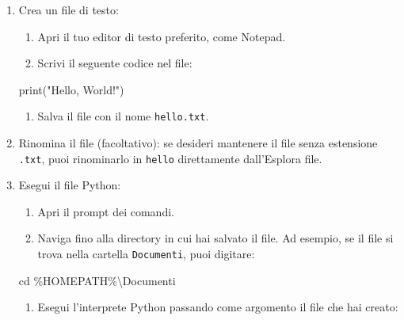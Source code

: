 \documentclass[
  letterpaper,
]{scrbook}
\newenvironment{Shaded}{\begin{snugshade}}{\end{snugshade}}
\newcommand{\BuiltInTok}[1]{\textcolor[rgb]{0.00,0.23,0.31}{#1}}
\newcommand{\DataTypeTok}[1]{\textcolor[rgb]{0.68,0.00,0.00}{#1}}
\newcommand{\NormalTok}[1]{\textcolor[rgb]{0.00,0.23,0.31}{#1}}
\newcommand{\StringTok}[1]{\textcolor[rgb]{0.13,0.47,0.30}{#1}}
\providecommand{\tightlist}{%
  \setlength{\itemsep}{0pt}\setlength{\parskip}{0pt}}\usepackage{longtable,booktabs,array}
\begin{document}
\begin{enumerate}
\def\labelenumi{\arabic{enumi}.}
\item
  Crea un file di testo:

  \begin{enumerate}
  \def\labelenumii{\roman{enumii}.}
  \tightlist
  \item
    Apri il tuo editor di testo preferito, come Notepad.
  \item
    Scrivi il seguente codice nel file:
  \end{enumerate}

\begin{Shaded}
\begin{Highlighting}[]
\BuiltInTok{print}\NormalTok{(}\StringTok{"Hello, World!"}\NormalTok{)}
\end{Highlighting}
\end{Shaded}

  \begin{enumerate}
  \def\labelenumii{\roman{enumii}.}
  \setcounter{enumii}{2}
  \tightlist
  \item
    Salva il file con il nome \texttt{hello.txt}.
  \end{enumerate}
\item
  Rinomina il file (facoltativo): se desideri mantenere il file senza
  estensione \texttt{.txt}, puoi rinominarlo in \texttt{hello}
  direttamente dall'Esplora file.
\item
  Esegui il file Python:

  \begin{enumerate}
  \def\labelenumii{\roman{enumii}.}
  \tightlist
  \item
    Apri il prompt dei comandi.
  \item
    Naviga fino alla directory in cui hai salvato il file. Ad esempio,
    se il file si trova nella cartella \texttt{Documenti}, puoi
    digitare:
  \end{enumerate}

\begin{Shaded}
\begin{Highlighting}[]
\BuiltInTok{cd}\NormalTok{ \%HOMEPATH\%}\DataTypeTok{\textbackslash{}D}\NormalTok{ocumenti}
\end{Highlighting}
\end{Shaded}

  \begin{enumerate}
  \def\labelenumii{\roman{enumii}.}
  \setcounter{enumii}{2}
  \tightlist
  \item
    Esegui l'interprete Python passando come argomento il file che hai
    creato:
  \end{enumerate}


\end{enumerate}
\end{document}

